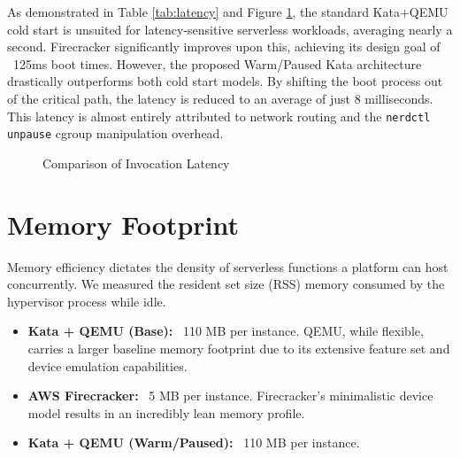 As demonstrated in Table \ref{tab:latency} and Figure \ref{fig:latency_chart}, the standard Kata+QEMU cold start is unsuited for latency-sensitive serverless workloads, averaging nearly a second. Firecracker significantly improves upon this, achieving its design goal of ~125ms boot times.
However, the proposed Warm/Paused Kata architecture drastically outperforms both cold start models. By shifting the boot process out of the critical path, the latency is reduced to an average of just 8 milliseconds. This latency is almost entirely attributed to network routing and the \texttt{nerdctl unpause} cgroup manipulation overhead.

\begin{figure}[h]
\centering
{}
\caption{Comparison of Invocation Latency}
\label{fig:latency_chart}
\end{figure}

\section{Memory Footprint}
Memory efficiency dictates the density of serverless functions a platform can host concurrently. We measured the resident set size (RSS) memory consumed by the hypervisor process while idle.

\begin{itemize}
    \item \textbf{Kata + QEMU (Base):} ~110 MB per instance. QEMU, while flexible, carries a larger baseline memory footprint due to its extensive feature set and device emulation capabilities.
    \item \textbf{AWS Firecracker:} ~5 MB per instance. Firecracker's minimalistic device model results in an incredibly lean memory profile.
    \item \textbf{Kata + QEMU (Warm/Paused):} ~110 MB per instance.
\end{itemize}

